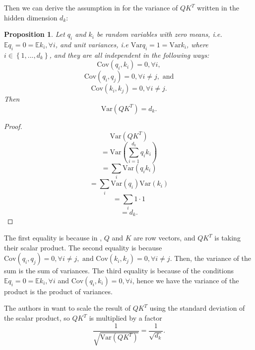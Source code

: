 \documentclass{article}
\theoremstyle{plain}
\theoremstyle{plain} %
\newtheorem{proposition}{Proposition}
\theoremstyle{definition}  %
\theoremstyle{remark}  %
\theoremstyle{plain}
\begin{document}
Then we can derive the assumption in \cite{vaswani2017attention} for the variance of $QK^T$ written in the hidden dimension $d_k$:
\begin{proposition}
Let $q_i$ and $k_i$ be random variables with zero means, i.e. $\mathbb{E} q_i=0=\mathbb{E} k_i, \forall i$, and unit variances, i.e $\text{Var} q_i=1=\text{Var}k_i$, where $i\in\left\lbrace 1,...,d_k\right\rbrace$, and they are all independent in the following ways:
$$
\text{Cov}\left( q_i,k_i\right)=0, \forall i,
$$
$$
\text{Cov}\left( q_i,q_j\right)=0, \forall i\neq j, \text{ and}
$$
$$
\text{Cov}\left( k_i,k_j\right)=0, \forall i\neq j.
$$
Then
$$
\text{Var}\left( QK^T\right)=d_k.
$$
\end{proposition}
 
\begin{proof}
$$
\text{Var}\left( QK^T\right)
$$
$$
=\text{Var}\left( \sum\limits_{i=1}^{d_k}q_ik_i\right)
$$
$$
=\sum\limits_i \text{Var}\left( q_ik_i\right)
$$
$$
=\sum\limits_i \text{Var}\left( q_i\right) \text{Var}\left( k_i\right)
$$
$$
=\sum\limits_i 1\cdot 1
$$
$$
=d_k.
$$
\end{proof}
The first equality is because in \cite{vaswani2017attention}, $Q$ and $K$ are row vectors, and $QK^T$ is taking their scalar product. The second equality is because $\text{Cov}\left( q_i,q_j\right)=0, \forall i\neq j, \text{ and } \text{Cov}\left( k_i,k_j\right)=0, \forall i\neq j.$ Then, the variance of the sum is the sum of variances. The third equality is because of the conditions $\mathbb{E} q_i=0=\mathbb{E} k_i, \forall i$ and $\text{Cov}\left( q_i,k_i\right)=0, \forall i$, hence we have the variance of the product is the product of variances.

The authors in \cite{vaswani2017attention} want to scale the result of $QK^T$ using the standard deviation of the scalar product, so $QK^T$ is multiplied by a factor 
$$\frac{1}{\sqrt{\text{Var}\left(QK^T \right)}}=\frac{1}{\sqrt{d_k}}.$$



\end{document}
